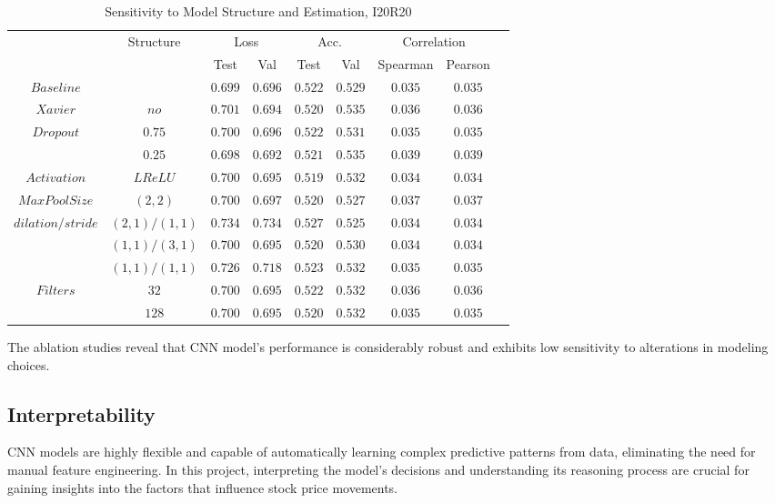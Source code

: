 \documentclass{article}
\begin{document}
\begin{table}[H] %
\centering
\caption{Sensitivity to Model Structure and Estimation, I20R20}
\begin{tabular}{ccccccccc} %
\toprule %
& \multicolumn{1}{c}{ Structure } & \multicolumn{2}{c}{Loss} & \multicolumn{2}{c}{Acc.} & \multicolumn{2}{c}{Correlation} \\
 \cmidrule(lr){3-4} \cmidrule(lr){5-6} \cmidrule(lr){7-8}
& & Test & Val & Test & Val & Spearman & Pearson \\
\midrule %
$Baseline$ & $  $ & $0.699$ & $0.696$ & $0.522$ & $0.529$ & $0.035$ & $0.035$ \\
$Xavier$ & $ no $ & $0.701$ & $0.694$ & $0.520$ & $0.535$ & $0.036$ & $0.036$ \\
$Dropout$ & $ 0.75 $ & $0.700$ & $0.696$ & $0.522$ & $0.531$ & $0.035$ & $0.035$ \\
$ $ & $ 0.25 $ & $0.698$ & $0.692$ & $0.521$ & $0.535$ & $0.039$ & $0.039$ \\

$ Activation $ & $ LReLU $ & $0.700$ & $0.695$ & $0.519$ & $0.532$ & $0.034$ & $0.034$ \\
$ MaxPool Size $ & $ (2,2) $ & $0.700$ & $0.697$ & $0.520$ & $0.527$ & $0.037$ & $0.037$ \\
$ dilation/stride $ & $ (2,1)/(1,1) $ & $0.734$ & $0.734$ & $0.527$ & $0.525$ & $0.034$ & $0.034$ \\
$  $ & $ (1,1)/(3,1) $ & $0.700$ & $0.695$ & $0.520$ & $0.530$ & $0.034$ & $0.034$ \\
$  $ & $ (1,1)/(1,1) $ & $0.726$ & $0.718$ & $0.523$ & $0.532$ & $0.035$ & $0.035$ \\
$ Filters $ & $ 32 $ & $0.700$ & $0.695$ & $0.522$ & $0.532$ & $0.036$ & $0.036$ \\
$  $ & $ 128 $ & $0.700$ & $0.695$ & $0.520$ & $0.532$ & $0.035$ & $0.035$ \\

\bottomrule %
\end{tabular}
\end{table}


The ablation studies reveal that CNN model’s performance is considerably robust and exhibits low sensitivity to alterations in modeling choices. 

\subsection{Interpretability}
CNN models are highly flexible and capable of automatically learning complex predictive patterns from data, eliminating the need for manual feature engineering. In this project, interpreting the model's decisions and understanding its reasoning process are crucial for gaining insights into the factors that influence stock price movements. 
\end{document}
